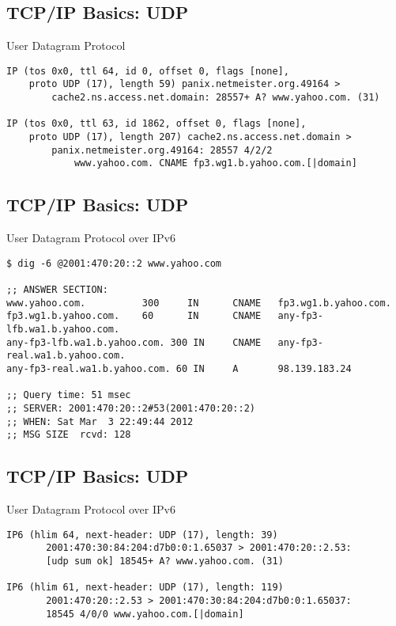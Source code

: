 \documentclass[xga]{xdvislides}
\begin{document}
\subsection{TCP/IP Basics: UDP}
\begin{center}
User Datagram Protocol
\end{center}
\vspace{.2in}
\begin{verbatim}
IP (tos 0x0, ttl 64, id 0, offset 0, flags [none],
    proto UDP (17), length 59) panix.netmeister.org.49164 >
        cache2.ns.access.net.domain: 28557+ A? www.yahoo.com. (31)

IP (tos 0x0, ttl 63, id 1862, offset 0, flags [none],
    proto UDP (17), length 207) cache2.ns.access.net.domain >
        panix.netmeister.org.49164: 28557 4/2/2
            www.yahoo.com. CNAME fp3.wg1.b.yahoo.com.[|domain]
\end{verbatim}

\subsection{TCP/IP Basics: UDP}
\begin{center}
User Datagram Protocol over IPv6
\end{center}
\vspace{.2in}
\begin{verbatim}
$ dig -6 @2001:470:20::2 www.yahoo.com

;; ANSWER SECTION:
www.yahoo.com.          300     IN      CNAME   fp3.wg1.b.yahoo.com.
fp3.wg1.b.yahoo.com.    60      IN      CNAME   any-fp3-lfb.wa1.b.yahoo.com.
any-fp3-lfb.wa1.b.yahoo.com. 300 IN     CNAME   any-fp3-real.wa1.b.yahoo.com.
any-fp3-real.wa1.b.yahoo.com. 60 IN     A       98.139.183.24

;; Query time: 51 msec
;; SERVER: 2001:470:20::2#53(2001:470:20::2)
;; WHEN: Sat Mar  3 22:49:44 2012
;; MSG SIZE  rcvd: 128

\end{verbatim}

\subsection{TCP/IP Basics: UDP}
\begin{center}
User Datagram Protocol over IPv6
\end{center}
\vspace{.2in}
\begin{verbatim}
IP6 (hlim 64, next-header: UDP (17), length: 39)
       2001:470:30:84:204:d7b0:0:1.65037 > 2001:470:20::2.53:
       [udp sum ok] 18545+ A? www.yahoo.com. (31)

IP6 (hlim 61, next-header: UDP (17), length: 119)
       2001:470:20::2.53 > 2001:470:30:84:204:d7b0:0:1.65037:
       18545 4/0/0 www.yahoo.com.[|domain]

\end{verbatim}
\end{document}
